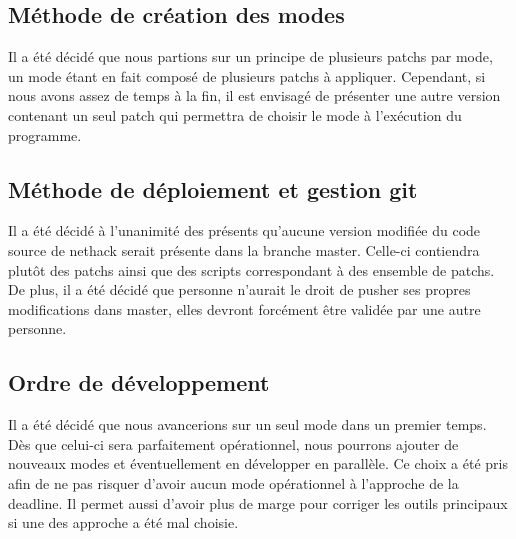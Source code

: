\documentclass{article}
\begin{document}
\subsection*{Méthode de création des modes}
Il a été décidé que nous partions sur un principe de plusieurs patchs par mode, un mode étant en fait composé de plusieurs patchs à appliquer. Cependant, si nous avons assez de temps à la fin, il est envisagé de présenter une autre version contenant un seul patch qui permettra de choisir le mode à l'exécution du programme.

\subsection*{Méthode de déploiement et gestion git}
Il a été décidé à l'unanimité des présents qu'aucune version modifiée du code source de nethack serait présente dans la branche master. Celle-ci contiendra plutôt des patchs ainsi que des scripts correspondant à des ensemble de patchs. De plus, il a été décidé que personne n'aurait le droit de pusher ses propres modifications dans master, elles devront forcément être validée par une autre personne.

\subsection*{Ordre de développement}
Il a été décidé que nous avancerions sur un seul mode dans un premier temps. Dès que celui-ci sera parfaitement opérationnel, nous pourrons ajouter de nouveaux modes et éventuellement en développer en parallèle. Ce choix a été pris afin de ne pas risquer d'avoir aucun mode opérationnel à l'approche de la deadline. Il permet aussi d'avoir plus de marge pour corriger les outils principaux si une des approche a été mal choisie.
\end{document}
